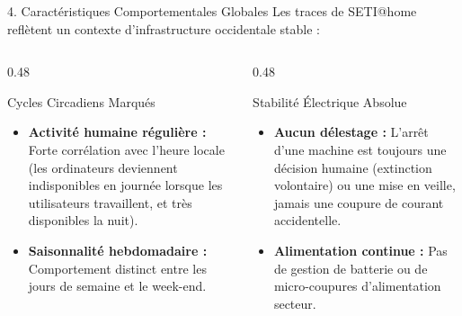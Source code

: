 \documentclass[10pt,aspectratio=169]{beamer}
\begin{document}
\begin{frame}{4. Caractéristiques Comportementales Globales}
  Les traces de SETI@home reflètent un contexte d'infrastructure occidentale stable :
  
  \begin{columns}[T]
    \begin{column}{0.48\textwidth}
      \begin{block}{Cycles Circadiens Marqués}
        \begin{itemize}
          \item \textbf{Activité humaine régulière :} Forte corrélation avec l'heure locale (les ordinateurs deviennent indisponibles en journée lorsque les utilisateurs travaillent, et très disponibles la nuit).
          \item \textbf{Saisonnalité hebdomadaire :} Comportement distinct entre les jours de semaine et le week-end.
        \end{itemize}
      \end{block}
    \end{column}
    
    \begin{column}{0.48\textwidth}
      \begin{alertblock}{Stabilité Électrique Absolue}
        \begin{itemize}
          \item \textbf{Aucun délestage :} L'arrêt d'une machine est toujours une décision humaine (extinction volontaire) ou une mise en veille, jamais une coupure de courant accidentelle.
          \item \textbf{Alimentation continue :} Pas de gestion de batterie ou de micro-coupures d'alimentation secteur.
        \end{itemize}
      \end{alertblock}
    \end{column}
  \end{columns}
\end{frame}
\end{document}
